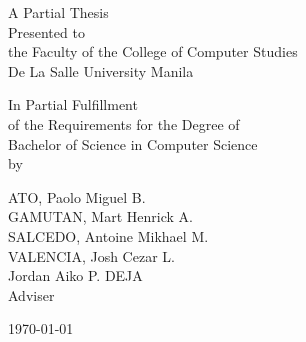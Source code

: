 %
%
%                 

\begin{titlepage}
\centering



\vspace{1.75cm}
A Partial Thesis\\
Presented to\\
the Faculty of the College of Computer Studies\\
De La Salle University Manila

\vspace{1.75cm}
In Partial Fulfillment\\
of the Requirements for the Degree of\\
Bachelor of Science in Computer Science\\
\vspace{1.75cm}
by\\
\vspace{1cm}

ATO, Paolo Miguel B.   \\
GAMUTAN, Mart Henrick A.  \\
SALCEDO, Antoine Mikhael M.   \\
VALENCIA, Josh Cezar L.   \\


\vspace{1.75cm}
Jordan Aiko P. DEJA \\
Adviser

\vspace{1.75cm}
\today
\end{titlepage}
